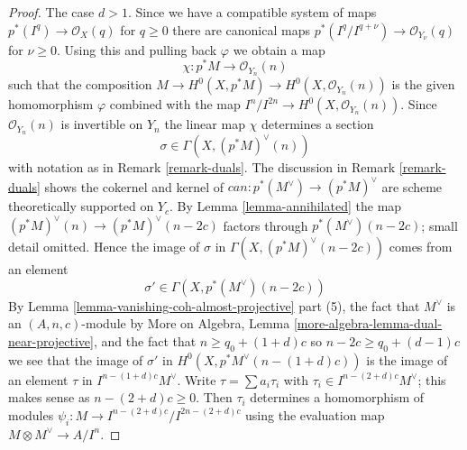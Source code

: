 \documentclass[10pt,a4paper]{amsart}
\theoremstyle{plain}
\theoremstyle{definition}
\theoremstyle{remark}
\numberwithin{equation}{subsection}
\begin{document}
\begin{proof}
The case $d > 1$. Since we have a compatible system of maps
$p^*(I^q) \to \mathcal{O}_X(q)$ for $q \geq 0$ there are canonical maps
$p^*(I^q/I^{q + \nu}) \to \mathcal{O}_{Y_\nu}(q)$ for $\nu \geq 0$.
Using this and pulling back $\varphi$ we obtain a map
$$
\chi : p^*M \longrightarrow \mathcal{O}_{Y_n}(n)
$$
such that the composition
$M \to H^0(X, p^*M) \to H^0(X, \mathcal{O}_{Y_n}(n))$
is the given homomorphism $\varphi$ combined with the
map $I^n/I^{2n} \to H^0(X, \mathcal{O}_{Y_n}(n))$.
Since $\mathcal{O}_{Y_n}(n)$ is invertible on $Y_n$ the
linear map $\chi$ determines a section
$$
\sigma \in \Gamma(X, (p^*M)^\vee(n))
$$
with notation as in Remark \ref{remark-duals}.
The discussion in Remark \ref{remark-duals} shows
the cokernel and kernel of $can : p^*(M^\vee) \to (p^*M)^\vee$
are scheme theoretically supported on $Y_c$. By
Lemma \ref{lemma-annihilated} the map
$(p^*M)^\vee(n) \to (p^*M)^\vee(n - 2c)$ factors
through $p^*(M^\vee)(n - 2c)$; small detail omitted.
Hence the image of $\sigma$ in $\Gamma(X, (p^*M)^\vee(n - 2c))$
comes from an element
$$
\sigma' \in \Gamma(X, p^*(M^\vee)(n - 2c))
$$
By Lemma \ref{lemma-vanishing-coh-almost-projective} part (5),
the fact that $M^\vee$ is an $(A, n, c)$-module by
More on Algebra, Lemma \ref{more-algebra-lemma-dual-near-projective},
and the fact that $n \geq q_0 + (1 + d)c$ so $n - 2c \geq q_0 + (d - 1)c$
we see that the image of $\sigma'$ in $H^0(X, p^*M^\vee(n - (1 + d)c))$
is the image of an element $\tau$ in $I^{n - (1 + d)c}M^\vee$.
Write $\tau = \sum a_i \tau_i$ with $\tau_i \in I^{n - (2 + d)c}M^\vee$;
this makes sense as $n - (2 + d)c \geq 0$.
Then $\tau_i$ determines a homomorphism of modules
$\psi_i : M \to I^{n - (2 + d)c}/I^{2n - (2 + d)c}$
using the evaluation map $M \otimes M^\vee \to A/I^n$.


\end{proof}
\end{document}
